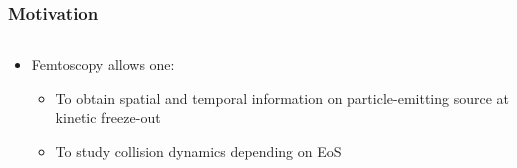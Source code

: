 \documentclass[dvipsnames] {beamer}
\begin{document}
\begin{frame}
        \bf 
        \vskip -0.5cm
        \frametitle{\bf \centering Motivation}
                   {\footnotesize 
                     \begin{columns}[t]
                       \begin{block}{}
                         \begin{itemize}
                         \item {\color{darkred!70!black} Femtoscopy allows one:}
                           \begin{itemize}
                           \item {\footnotesize To obtain spatial and temporal information on particle-emitting source at kinetic freeze-out}
                           \item {\footnotesize To study collision dynamics depending on EoS}
                           \end{itemize}
                         \end{itemize}
                         

\end{block}
\end{columns}}
\end{frame}
\end{document}
